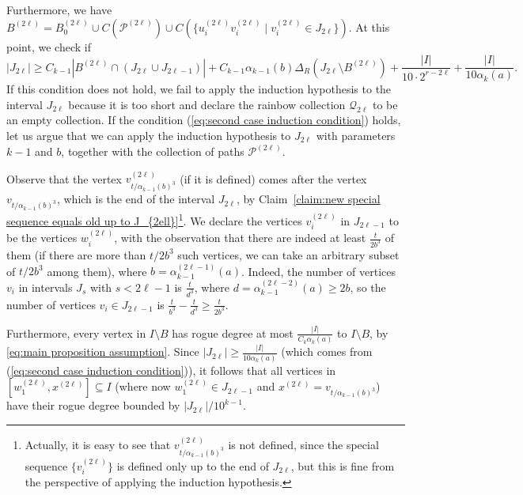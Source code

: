 \documentclass[a4paper,11pt]{article}
\makeatletter
\renewenvironment{proof}[1][\proofname] {\par\pushQED{\qed}\normalfont\topsep6\p@\@plus6\p@\relax\trivlist\item[\hskip\labelsep\bfseries#1\@addpunct{.}]\ignorespaces}{\popQED\endtrivlist\@endpefalse}
\theoremstyle{definition}
\def\cP{\mathcal{P}}
\def\cQ{\mathcal{Q}}
\makeatother
\begin{document}
\begin{proof}
Furthermore, we have $B^{(2\ell)}=B^{(2\ell)}_0\cup C(\cP^{(2\ell)})\cup C(\{u_i^{(2\ell)}v_i^{(2\ell)}\mid v_i^{(2\ell)}\in J_{2\ell}\})$.
At this point, we check if 
\begin{equation}\label{eq:second case induction condition}
|J_{2\ell}|\geq C_{k-1}|B^{(2\ell)}\cap (J_{2\ell}\cup J_{2\ell-1})| +C_{k-1} \alpha_{k-1}(b)\Delta_R(J_{2\ell} \setminus B^{(2\ell)})+\frac{|I|}{10\cdot 2^{r-2\ell}}+\frac{|I|}{10\alpha_k(a)}.
\end{equation}
If this condition does not hold, we fail to apply the induction hypothesis to the interval $J_{2\ell}$ because it is too short and declare the rainbow collection $\cQ_{2\ell}$ to be an empty collection. If the condition (\ref{eq:second case induction condition}) holds, let us argue that we can apply the induction hypothesis to $J_{2\ell}$ with parameters $k-1$ and $b$, together with the collection of paths $\cP^{(2\ell)}$.

Observe that the vertex $v_{t/\alpha_{k-1}(b)^3}^{(2\ell)}$ (if it is defined) comes after the vertex $v_{t/\alpha_{k-1}(b)^3}$, which is the end of the interval $J_{2\ell}$, by Claim~\ref{claim:new special sequence equals old up to J_{2ell}}\footnote{Actually, it is easy to see that $v_{t/\alpha_{k-1}(b)^3}^{(2\ell)}$ is not defined, since the special sequence $\{v_i^{(2\ell)}\}$ is defined only up to the end of $J_{2\ell}$, but this is fine from the perspective of applying the induction hypothesis.}.
We declare the vertices $v_i^{(2\ell)}$ in $J_{2\ell-1}$ to be the vertices $w_i^{(2\ell)}$, with the observation that there are indeed at least $\frac{t}{2b^3}$ of them (if there are more than $t/2b^3$ such vertices, we can take an arbitrary subset of $t/2b^3$ among them), where $b=\alpha_{k-1}^{(2\ell-1)}(a)$. 
Indeed, the number of vertices $v_i$ in intervals $J_s$ with $s < 2\ell-1$ is $\frac{t}{d^3}$, where $d = \alpha_{k-1}^{(2\ell-2)}(a) \geq 2b$, so the number of vertices $v_i \in J_{2\ell-1}$ is $\frac{t}{b^3} - \frac{t}{d^3} \geq \frac{t}{2b^3}$.

Furthermore, every vertex in $I \setminus B$ has rogue degree at most $\frac{|I|}{C_k \alpha_k(a)}$ to $I \setminus B$, by \eqref{eq:main proposition assumption}. Since $|J_{2\ell}|\geq \frac{|I|}{10 \alpha_k(a)}$ (which comes from (\ref{eq:second case induction condition})), it follows that all vertices in $[w_1^{(2\ell)},x^{(2\ell)}] \subseteq I$ (where now $w_1^{(2\ell)} \in J_{2\ell-1}$ and $x^{(2\ell)} = v_{t/\alpha_{k-1}(b)^3}$) have their rogue degree bounded by $|J_{2\ell}|/10^{k-1}$. 


\end{proof}
\end{document}
